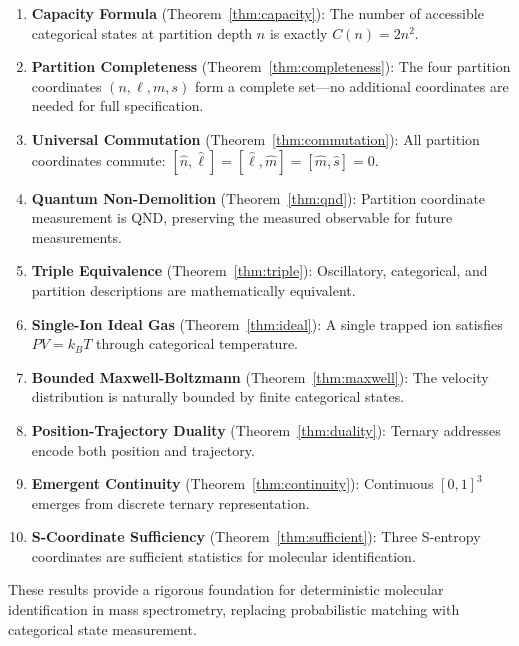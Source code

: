 \begin{enumerate}
    \item \textbf{Capacity Formula} (Theorem~\ref{thm:capacity}): The number of accessible categorical states at partition depth $n$ is exactly $C(n) = 2n^2$.

    \item \textbf{Partition Completeness} (Theorem~\ref{thm:completeness}): The four partition coordinates $(n, \ell, m, s)$ form a complete set---no additional coordinates are needed for full specification.

    \item \textbf{Universal Commutation} (Theorem~\ref{thm:commutation}): All partition coordinates commute: $[\hat{n}, \hat{\ell}] = [\hat{\ell}, \hat{m}] = [\hat{m}, \hat{s}] = 0$.

    \item \textbf{Quantum Non-Demolition} (Theorem~\ref{thm:qnd}): Partition coordinate measurement is QND, preserving the measured observable for future measurements.

    \item \textbf{Triple Equivalence} (Theorem~\ref{thm:triple}): Oscillatory, categorical, and partition descriptions are mathematically equivalent.

    \item \textbf{Single-Ion Ideal Gas} (Theorem~\ref{thm:ideal}): A single trapped ion satisfies $PV = k_B T$ through categorical temperature.

    \item \textbf{Bounded Maxwell-Boltzmann} (Theorem~\ref{thm:maxwell}): The velocity distribution is naturally bounded by finite categorical states.

    \item \textbf{Position-Trajectory Duality} (Theorem~\ref{thm:duality}): Ternary addresses encode both position and trajectory.

    \item \textbf{Emergent Continuity} (Theorem~\ref{thm:continuity}): Continuous $[0,1]^3$ emerges from discrete ternary representation.

    \item \textbf{S-Coordinate Sufficiency} (Theorem~\ref{thm:sufficient}): Three S-entropy coordinates are sufficient statistics for molecular identification.
\end{enumerate}

These results provide a rigorous foundation for deterministic molecular identification in mass spectrometry, replacing probabilistic matching with categorical state measurement.

